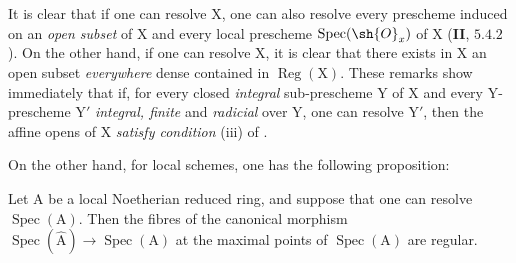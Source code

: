 \begin{env}[7.9.2]
\label{IV.7.9.2}
It is clear that if one can resolve $\mathrm{X}$, one can also resolve every prescheme induced on an \emph{open subset} of $\mathrm{X}$ and every local prescheme $\operatorname{Spec}(\sh{O}_x)$ of $\mathrm{X}$ (\textbf{II}, $5.4.2$). On the other hand, if one can resolve $\mathrm{X}$, it is clear that there exists in $\mathrm{X}$ an open subset \emph{everywhere} dense contained in $\operatorname{Reg}(\mathrm{X})$. These remarks show immediately that if, for every closed \emph{integral} sub-prescheme $\mathrm{Y}$ of $\mathrm{X}$ and every $\mathrm{Y}$-prescheme $\mathrm{Y}'$ \emph{integral, finite} and \emph{radicial} over $\mathrm{Y}$, one can resolve $\mathrm{Y}'$, then the affine opens of $\mathrm{X}$ \emph{satisfy condition} (iii) of .

On the other hand, for local schemes, one has the following proposition:
\end{env}

\begin{proposition}[7.9.3]
\label{IV.7.9.3}
Let $\mathrm{A}$ be a local Noetherian reduced ring, and suppose that one can resolve $\operatorname{Spec}(\mathrm{A})$. Then the fibres of the canonical morphism $\operatorname{Spec}(\widehat{\mathrm{A}})\to\operatorname{Spec}(\mathrm{A})$ at the maximal points of $\operatorname{Spec}(\mathrm{A})$ are regular.
\end{proposition}

